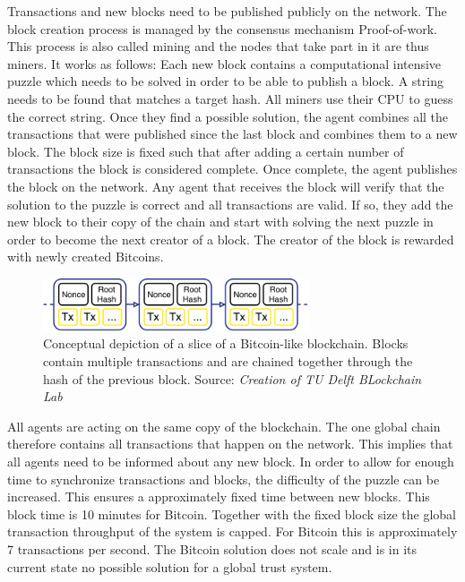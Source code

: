 Transactions and new blocks need to be published publicly on the network. The block creation process
is managed by the consensus mechanism Proof-of-work. This process is also called mining and the nodes
that take part in it are thus miners. It works as follows: Each new block contains a computational 
intensive puzzle which needs to be solved in order to be able to publish a block. A string needs to 
be found that matches a target hash. All miners use their CPU to guess the correct string. Once they
find a possible solution, the agent combines all the transactions that were published since the last
block and combines them to a new block. The block size is fixed such that after adding a certain number of 
transactions the block is considered complete. Once complete, the agent publishes the
block on the network. Any agent that receives the block will verify that
the solution to the puzzle is correct and all transactions are valid. If so, they add the new block
to their copy of the chain and start with solving the next puzzle in order to become the next 
creator of a block. The creator of the block is rewarded with newly created Bitcoins.

\begin{figure}
    \centering
    \includegraphics[width=0.7\textwidth]{images/blockchain.pdf}
    \caption{Conceptual depiction of a slice of a Bitcoin-like blockchain. Blocks contain multiple transactions and are chained together through the hash of the previous block. Source: \textit{Creation of TU Delft BLockchain Lab}}
    \label{fig:basic_blockchain}
\end{figure}

All agents are acting on the same copy of the blockchain. The one global chain therefore contains 
all transactions that happen on the network. This implies that all agents need to be informed about any new block.
In order to allow for enough time to synchronize transactions and blocks, the difficulty of the puzzle 
can be increased. This ensures a approximately fixed time between new blocks. This block time is 
10 minutes for Bitcoin. Together with the fixed block size the global transaction throughput of the
system is capped. For Bitcoin this is approximately 7 transactions per second. The Bitcoin solution
does not scale and is in its current state no possible solution for a global trust system.

